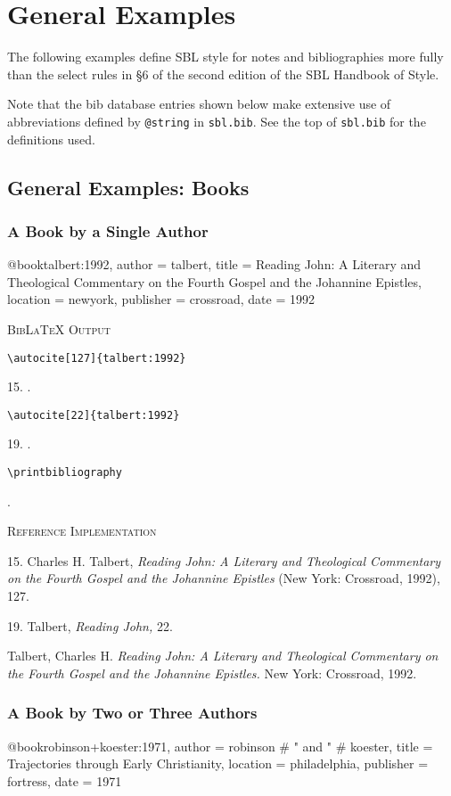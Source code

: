\documentclass[a4paper]{article}
\newcommand\citetest[5]{%
  {\textsc{BibLaTeX Output}\par
   \nobreak
   \texttt{\textbackslash autocite[#2]\{#5\}}\par
   \color{biblatex-colour}
   #1. \cite[#2]{#5}.\par
   \color{black}
   \texttt{\textbackslash autocite[#4]\{#5\}}\par
   \color{biblatex-colour}
   #3. \cite[#4]{#5}.\par
   \color{black}
   \texttt{\textbackslash printbibliography}\par
   \color{biblatex-colour}
   \hangindent\bibindent\bibentrycite{#5}.\par}}
\newenvironment{refimp}{%
  \begin{minipage}{\linewidth}
    \setlength{\parskip}{1ex}
    \textsc{Reference Implementation}\par
    \nobreak
    \color{reference-colour}
}{\end{minipage}}
\newenvironment{vb}{%
  \setlength{\parskip}{0pt}
  \verbatim}{\endverbatim}
\begin{document}
\setcounter{section}{5}

\section{General Examples}

The following examples define SBL style for notes and bibliographies more
fully than the select rules in §6 of the second edition of the SBL Handbook of
Style.

Note that the bib database entries shown below make extensive use of
abbreviations defined by \texttt{@string} in \texttt{sbl.bib}. See the top of
\texttt{sbl.bib} for the definitions used.

\setcounter{subsection}{1}
\subsection{General Examples: Books}

\subsubsection{A Book by a Single Author}

\begin{vb}
@book{talbert:1992,
  author = talbert,
  title = {Reading John: A Literary and Theological Commentary
           on the Fourth Gospel and the Johannine Epistles},
  location = newyork,
  publisher = crossroad,
  date = {1992}
}
\end{vb}

\citetest{15}{127}{19}{22}{talbert:1992}


\begin{refimp}
  15. Charles H. Talbert, \emph{Reading John: A Literary and Theological
  Commentary on the Fourth Gospel and the Johannine Epistles} (New York:
  Crossroad, 1992), 127.

  19. Talbert, \emph{Reading John,} 22.

  \hangindent\bibindent Talbert, Charles H. \emph{Reading John: A Literary and
  Theological Commentary on the Fourth Gospel and the Johannine Epistles.} New
  York: Crossroad, 1992.
\end{refimp}

\subsubsection{A Book by Two or Three Authors}

\begin{vb}
@book{robinson+koester:1971,
  author = robinson # " and " # koester,
  title = {Trajectories through Early Christianity},
  location = philadelphia,
  publisher = fortress,
  date = {1971}
}
\end{vb}  
\end{document}
